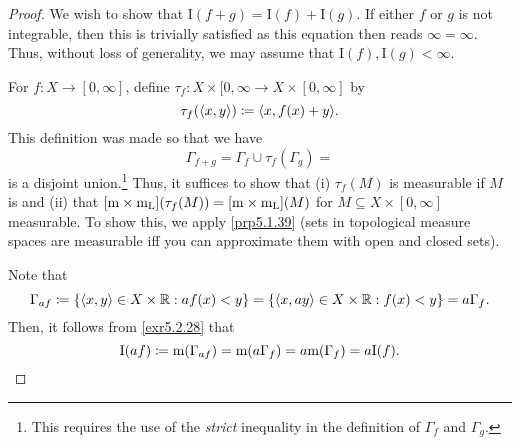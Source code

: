 \begin{thm}[Integral]
\begin{proof}
We wish to show that $\mathrm{I}(f+g)=\mathrm{I}(f)+\mathrm{I}(g)$.  If either $f$ or $g$ is not integrable, then this is trivially satisfied as this equation then reads $\infty =\infty$.  Thus, without loss of generality, we may assume that $\mathrm{I}(f),\mathrm{I}(g)<\infty$.

For $f:X\rightarrow [0,\infty ]$, define $\tau _f:X\times [0,\infty \rightarrow X\times [0,\infty ]$ by
\begin{equation}
\tau _f(\langle x,y\rangle)\coloneqq \langle x,f(x)+y\rangle.
\end{equation}
This definition was made so that we have
\begin{equation}
\Gamma _{f+g}=\Gamma _f\cup \tau _f(\Gamma _g)=
\end{equation}
is a disjoint union.\footnote{This requires the use of the \emph{strict} inequality in the definition of $\Gamma _f$ and $\Gamma _g$.}  Thus, it suffices to show that (i) $\tau _f(M)$ is measurable if $M$ is and (ii) that $[\mathrm{m} \times \mathrm{m} _{\mathrm{L}}](\tau _f(M))=[\mathrm{m} \times \mathrm{m} _{\mathrm{L}}](M)$ for $M\subseteq X\times [0,\infty ]$ measurable.  To show this, we apply \cref{prp5.1.39} (sets in topological measure spaces are measurable iff you can approximate them with open and closed sets).

Note that
\begin{equation}
\Gamma _{af}\coloneqq \left\{ \langle x,y\rangle\in X\times \mathbb{R} :af(x)<y\right\} =\left\{ \langle x,ay\rangle\in X\times \mathbb{R} :f(x)<y\right\} =a\Gamma _f.
\end{equation}
Then, it follows from \cref{exr5.2.28} that
\begin{equation}
\mathrm{I}(af)\coloneqq \mathrm{m} (\Gamma _{af})=\mathrm{m} (a\Gamma _f)=a\mathrm{m} (\Gamma _f)=a\mathrm{I}(f).
\end{equation}


\end{proof}
\end{thm}
